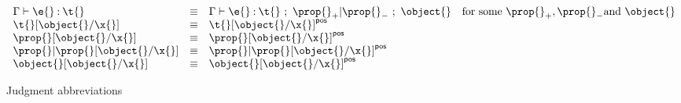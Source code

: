 \begin{figure*}
$$
\begin{array}{lllr}
  \judgementtwo{\propenv{}}{\e{}}{\t{}} &\equiv& 
  \judgement{\propenv{}}{\e{}}{\t{}}{\filterset{\thenprop{\prop{}}}{\elseprop{\prop{}}}}{\object{}}
  & \text{for some}\ {\thenprop{\prop{}}}, {\elseprop{\prop{}}} \text{and}\ {\object{}}

  \\
  {\replacefor{\t{}}{\object{}}{\x{}}} &\equiv& {\pluspolarity{\replacefor{\t{}}{\object{}}{\x{}}}}
  \\
  {\replacefor{\prop{}}{\object{}}{\x{}}} &\equiv&  {\pluspolarity{\replacefor{\prop{}}{\object{}}{\x{}}}}
  \\
  {\replacefor{\filterset{\prop{}}{\prop{}}}{\object{}}{\x{}}} &\equiv&  {\pluspolarity{\replacefor{\filterset{\prop{}}{\prop{}}}{\object{}}{\x{}}}}
  \\
  {\replacefor{\object{}}{\object{}}{\x{}}} &\equiv& {\pluspolarity{\replacefor{\object{}}{\object{}}{\x{}}}}

\end{array}
$$
\caption{Judgment abbreviations}
\end{figure*}
